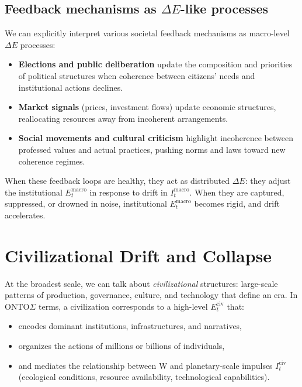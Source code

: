\documentclass[12pt,a4paper]{report}
\newcommand{\Will}{W}
\begin{document}
\subsection*{Feedback mechanisms as \texorpdfstring{$\Delta E$}{ΔE}-like processes}

We can explicitly interpret various societal feedback mechanisms as macro-level $\Delta E$ processes:

\begin{itemize}[leftmargin=2em]
    \item \textbf{Elections and public deliberation} update the composition and priorities of political structures when coherence between citizens' needs and institutional actions declines.
    \item \textbf{Market signals} (prices, investment flows) update economic structures, reallocating resources away from incoherent arrangements.
    \item \textbf{Social movements and cultural criticism} highlight incoherence between professed values and actual practices, pushing norms and laws toward new coherence regimes.
\end{itemize}

When these feedback loops are healthy, they act as distributed $\Delta E$: they adjust the institutional \(E_t^{\mathrm{macro}}\) in response to drift in \(I_t^{\mathrm{macro}}\). When they are captured, suppressed, or drowned in noise, institutional \(E_t^{\mathrm{macro}}\) becomes rigid, and drift accelerates.

\section{Civilizational Drift and Collapse}

At the broadest scale, we can talk about \emph{civilizational} structures: large-scale patterns of production, governance, culture, and technology that define an era. In ONTO$\Sigma$ terms, a civilization corresponds to a high-level \(E_t^{\mathrm{civ}}\) that:

\begin{itemize}[leftmargin=2em]
    \item encodes dominant institutions, infrastructures, and narratives,
    \item organizes the actions of millions or billions of individuals,
    \item and mediates the relationship between \Will{} and planetary-scale impulses \(I_t^{\mathrm{civ}}\) (ecological conditions, resource availability, technological capabilities).
\end{itemize}
\end{document}
